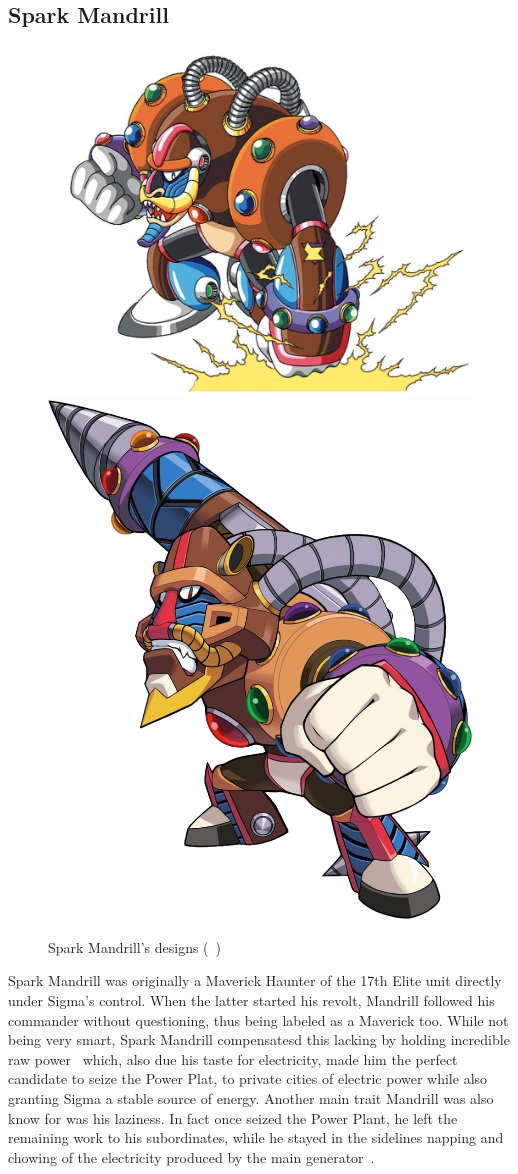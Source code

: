 \subsection{Spark Mandrill}\label{boss:Spark_mandrill}
\begin{figure}[htp]
	\centering
	\includegraphics[width=0.5\linewidth]{figures/X1/Spark_mandrill/SparkMandrill.jpg}
	\includegraphics[width=0.4\linewidth]{figures/X1/Spark_mandrill/MHXSparkMandrill.png}
	\caption{Spark Mandrill's designs (~\cite{book:MMX_Complete_art})}
\end{figure}
Spark Mandrill was originally a Maverick Haunter of the 17th Elite unit directly under Sigma's control. When the latter started his revolt, Mandrill followed his commander without questioning, thus being labeled as a Maverick too. While not being very smart, Spark Mandrill compensatesd this lacking by holding incredible raw power~\cite{MHX:manual} which, also due his taste for electricity, made him the perfect candidate to seize the Power Plat, to private cities of electric power while also granting Sigma a stable source of energy. Another main trait Mandrill was also know for was his laziness. In fact once seized the Power Plant, he left the remaining work to his subordinates, while he stayed in the sidelines napping and chowing of the electricity produced by the main generator~\cite{wayback:X_resources}.
